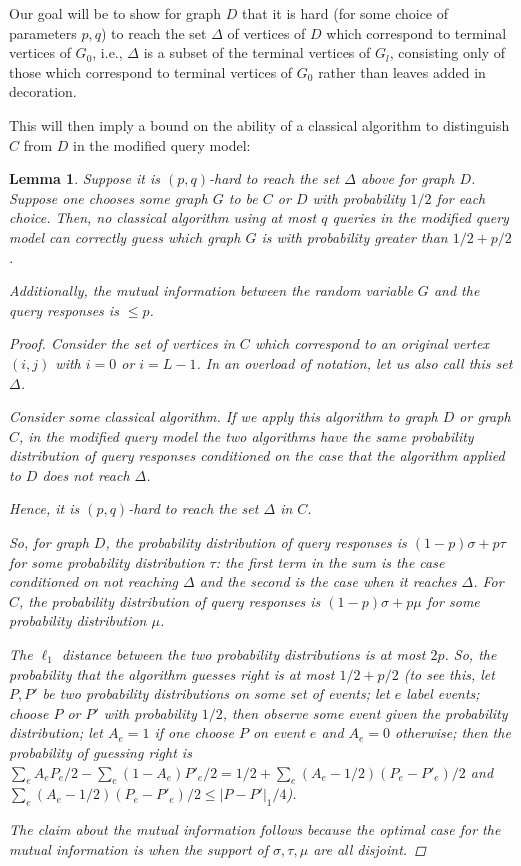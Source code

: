 \documentclass[letterpaper,onecolumn]{quantumarticle}
\newtheorem{lemma}{Lemma}
\newcommand{\glen}{L}
\begin{document}
Our goal will be to show for graph $D$ that it is hard (for some choice of parameters $p,q$) to reach the set $\Delta$ of vertices of $D$ which correspond to terminal vertices of $G_0$, i.e., $\Delta$ is a subset of the terminal vertices of $G_l$, consisting only of those which correspond to terminal vertices of $G_0$ rather than leaves added in decoration.

This will then imply a bound on the ability of a classical algorithm to distinguish $C$ from $D$ in the modified query model:
\begin{lemma}
\label{distlemma}
Suppose it is $(p,q)$-hard to reach the set $\Delta$ above for graph $D$.
Suppose one chooses
some graph $G$
to be $C$ or $D$ with probability $1/2$ for each choice.  Then, no classical algorithm using at most $q$ queries in the modified query model can correctly guess which graph $G$ is with probability greater than $1/2+p/2$.

Additionally, the mutual information between the random variable $G$ and the query responses is $\leq p$.
\begin{proof}
Consider the set of vertices in $C$ which correspond to an original vertex $(i,j)$ with $i=0$ or $i=\glen-1$.  In an overload of notation, let us also call this set $\Delta$.


Consider some classical algorithm. 
 If we apply this algorithm to graph $D$ or graph $C$, in the modified query model the two algorithms have the same probability distribution of query responses conditioned on the case that the algorithm applied to $D$ does not reach $\Delta$.

Hence, it is $(p,q)$-hard to reach the set $\Delta$ in $C$.


So, for graph $D$, the probability distribution of query responses is $(1-p) \sigma+p \tau$ for some probability distribution $\tau$: the first term in the sum is the case conditioned on not reaching $\Delta$ and the second is the case when it reaches $\Delta$.
For $C$, the probability distribution of query responses is $(1-p)\sigma+p\mu$ for some probability distribution $\mu$.

The $\ell_1$ distance between the two probability distributions is at most $2p$.  So, the probability that the algorithm guesses right is at most $1/2+p/2$ (to see this, let $P,P'$ be two probability distributions on some set of events; let $e$ label events; choose $P$ or $P'$ with probability $1/2$, then observe some event given the probability distribution; let $A_e=1$ if one choose $P$ on event $e$ and $A_e=0$ otherwise; then the probability of guessing right is $\sum_e A_e P_e/2 - \sum_e (1-A_e) P'_e/2=1/2+\sum_e (A_e-1/2) (P_e-P'_e)/2$ and $\sum_e (A_e-1/2) (P_e-P'_e)/2\leq |P-P'|_1/4$).

The claim about the mutual information follows because the optimal case for the mutual information is when the support of $\sigma,\tau,\mu$ are all disjoint. 
\end{proof}
\end{lemma}
\end{document}
